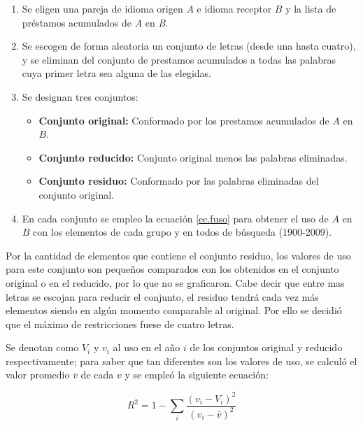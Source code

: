 \begin{enumerate}
	
	\item Se eligen una pareja de idioma origen $\textit{A}$ e idioma receptor $\textit{B}$ y la lista de préstamos acumulados de \textit{A} en \textit{B}.
	
	\item Se escogen de forma aleatoria un conjunto de letras (desde una hasta cuatro), y se eliminan del conjunto de prestamos acumulados  a todas las palabras cuya primer letra sea alguna de las elegidas.  
	
	\newpage
	
	\item Se designan tres conjuntos:
	
		\begin{itemize}
			\item \textbf{Conjunto original:} Conformado por los prestamos acumulados  de $\textit{A}$  en $\textit{B}$.
			\item \textbf{Conjunto reducido:} Conjunto original menos las palabras eliminadas. 
			\item \textbf{Conjunto residuo:} Conformado por las palabras eliminadas del conjunto original. 
		\end{itemize}
	
	\item En cada conjunto se empleo la ecuación \ref{ec.fuso} para obtener el uso de $\textit{A}$ en $\textit{B}$  con los elementos de cada grupo y en todos de búsqueda (1900-2009).
	
	 
	
\end{enumerate}


Por la cantidad de elementos que contiene el conjunto residuo, los valores de uso para este conjunto son pequeños comparados con los obtenidos en el conjunto original o en el reducido, por lo que no se graficaron. Cabe decir que entre mas letras se escojan para reducir el conjunto, el residuo tendrá cada vez más elementos siendo en algún momento comparable al original.  Por ello se decidió que el máximo de restricciones fuese de cuatro letras. 

Se denotan como $V_{i}$ y $v_{i}$ al uso en el año $i$ de los conjuntos original y reducido respectivamente; para saber que tan diferentes son los valores de uso, se calculó el valor promedio $\bar{v}$ de cada $v$  y  se empleó la siguiente ecuación:

\begin{equation}
\label{ec.dif_uso}
R^{2} = 1 - \sum_{i} \frac{ \left( v_{i} - V_{i} \right)^{2}  }{ \left( v_{i} - \bar{v} \right)^{2} }
\end{equation}


